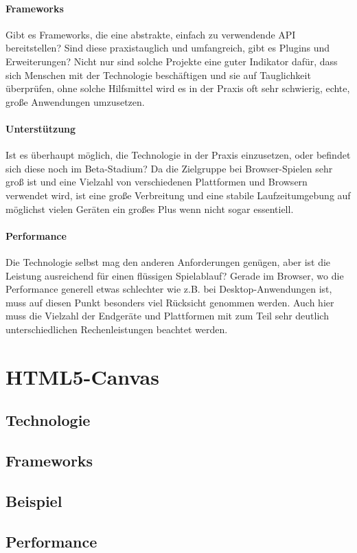 \documentclass[a4paper,12pt]{article}
\begin{document}
\paragraph{Frameworks}
Gibt es Frameworks, die eine abstrakte, einfach zu verwendende API bereitstellen? Sind diese praxistauglich und umfangreich, gibt es Plugins und Erweiterungen? Nicht nur sind solche Projekte eine guter Indikator dafür, dass sich Menschen mit der Technologie beschäftigen und sie auf Tauglichkeit überprüfen, ohne solche Hilfsmittel wird es in der Praxis oft sehr schwierig, echte, große Anwendungen umzusetzen.
\paragraph{Unterstützung}
Ist es überhaupt möglich, die Technologie in der Praxis einzusetzen, oder befindet sich diese noch im Beta-Stadium? Da die Zielgruppe bei Browser-Spielen sehr groß ist und eine Vielzahl von verschiedenen Plattformen und Browsern verwendet wird, ist eine große Verbreitung und eine stabile Laufzeitumgebung auf möglichst vielen Geräten ein großes Plus wenn nicht sogar essentiell.
\paragraph{Performance}
Die Technologie selbst mag den anderen Anforderungen genügen, aber ist die Leistung ausreichend für einen flüssigen Spielablauf? Gerade im Browser, wo die Performance generell etwas schlechter wie z.B. bei Desktop-Anwendungen ist, muss auf diesen Punkt besonders viel Rücksicht genommen werden. Auch hier muss die Vielzahl der Endgeräte und Plattformen mit zum Teil sehr deutlich unterschiedlichen Rechenleistungen beachtet werden.
\section{HTML5-Canvas}
\subsection{Technologie}
\subsection{Frameworks}
\subsection{Beispiel}
\subsection{Performance}
\end{document}
